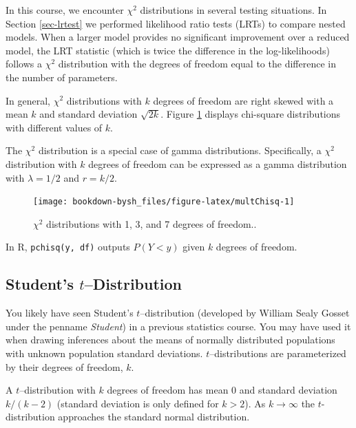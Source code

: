\documentclass[
]{krantz}
\begin{document}
In this course, we encounter \(\chi^2\) distributions  in several testing situations. In Section \ref{sec-lrtest} we performed likelihood ratio tests (LRTs) to compare nested models. When a larger model provides no significant improvement over a reduced model, the LRT statistic (which is twice the difference in the log-likelihoods) follows a \(\chi^2\) distribution with the degrees of freedom equal to the difference in the number of parameters.

In general, \(\chi^2\) distributions with \(k\) degrees of freedom are right skewed with a mean \(k\) and standard deviation \(\sqrt{2k}\). Figure \ref{fig:multChisq} displays chi-square distributions with different values of \(k\).

The \(\chi^2\) distribution is a special case of gamma distributions. Specifically, a \(\chi^2\) distribution with \(k\) degrees of freedom can be expressed as a gamma distribution with \(\lambda = 1/2\) and \(r = k/2\).



\begin{figure}

{\centering \texttt{[image: bookdown-bysh\_files/figure-latex/multChisq-1]} 

}

\caption{\(\chi^2\) distributions with 1, 3, and 7 degrees of freedom..}\label{fig:multChisq}
\end{figure}

In R, \texttt{pchisq(y,\ df)} outputs \(P(Y < y)\) given \(k\) degrees of freedom.

\hypertarget{students-tdistribution}{%
\subsection{\texorpdfstring{Student's \(t\)--Distribution}{Student's t--Distribution}}\label{students-tdistribution}}

You likely have seen Student's \(t\)--distribution  (developed by William Sealy Gosset under the penname \emph{Student}) in a previous statistics course. You may have used it when drawing inferences about the means of normally distributed populations with unknown population standard deviations. \(t\)--distributions are parameterized by their degrees of freedom, \(k\).

A \(t\)--distribution with \(k\) degrees of freedom has mean \(0\) and standard deviation \(k/(k-2)\) (standard deviation is only defined for \(k > 2\)). As \(k \rightarrow \infty\) the \(t\)-distribution approaches the standard normal distribution.
\end{document}
